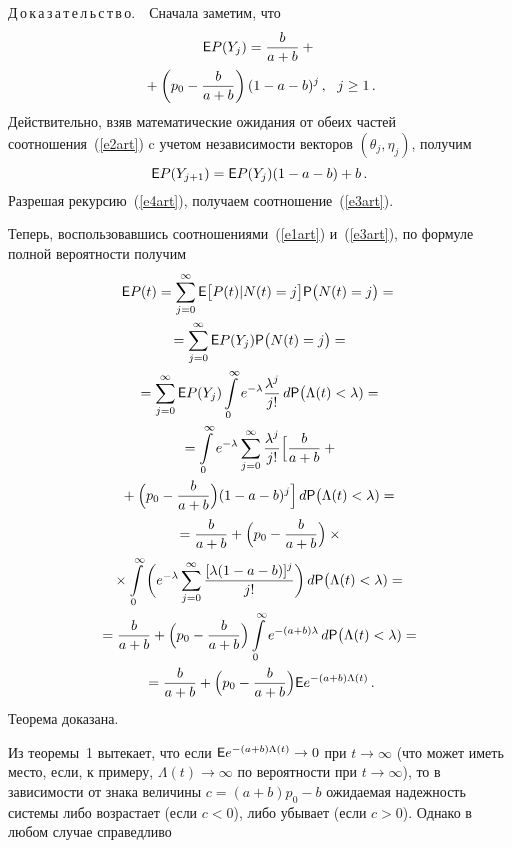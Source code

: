 \begin{multicols}{2}
\smallskip

\noindent
Д\,о\,к\,а\,з\,а\,т\,е\,л\,ь\,с\,т\,в\,о.\ $\,$ Сначала заметим, что
\begin{multline}
{\sf E}P(Y_j)=\displaystyle\frac{\displaystyle b\mathstrut}{\displaystyle a+b\mathstrut}+{}\\
{}+\left (p_0-\displaystyle\frac{\displaystyle b\mathstrut}{\displaystyle a+b\mathstrut}\right )
(1-a-b)^j\,,\ \ j\ge1\,.
\label{e3art}
\end{multline}
Действительно, взяв математические ожидания от обеих частей
соотношения~(\ref{e2art}) c учетом независимости векторов
$(\theta_j,\eta_j)$, получим
\begin{equation}
{\sf E}P(Y_{j+1})={\sf E}P(Y_j)(1-a-b)+b\,.
\label{e4art}
\end{equation}
Разрешая рекурсию~(\ref{e4art}), получаем соотношение~(\ref{e3art}).

Теперь, воспользовавшись соотношениями~(\ref{e1art}) и~(\ref{e3art}),
по формуле полной вероятности получим
\begin{multline*}
{\sf E}P(t)=\sum_{j=0}^{\infty}{\sf E}\big[P(t)|N(t)=j\big]{\sf
P}\big(N(t)=j\big)={}\\
{}=\sum_{j=0}^{\infty}{\sf E}P(Y_j){\sf
P}\big(N(t)=j\big)={}\\
{}=\sum_{j=0}^{\infty}{\sf
E}P(Y_j)\int\limits_{0}^{\infty}e^{-\lambda}\displaystyle\frac{\displaystyle \lambda^j\mathstrut}{\displaystyle j!\mathstrut}\,d{\sf
P}\big(\Lambda(t)<\lambda)=
{}\\
{}=
\int\limits_{0}^{\infty}e^{-\lambda}\sum_{j=0}^{\infty}\displaystyle\frac{\displaystyle \lambda^j\mathstrut}{\displaystyle j!\mathstrut}\Big[
\displaystyle\frac{\displaystyle b\mathstrut}{\displaystyle a+b\mathstrut}+{}\\
{}+ \Big(p_0-\displaystyle\frac{\displaystyle b\mathstrut}{\displaystyle a+b\mathstrut}\Big)
(1-a-b)^j\Big]\,d{\sf P}\big(\Lambda(t)<\lambda)=
{}\\
{}
=\displaystyle\frac{\displaystyle b\mathstrut}{\displaystyle a+b\mathstrut}+\Big(p_0-\displaystyle\frac{\displaystyle b\mathstrut}{\displaystyle a+b\mathstrut}\Big)\times{}\\
{}\times \int\limits_{0}^{\infty}\bigg(e^{-\lambda}
\sum_{j=0}^{\infty}\displaystyle\frac{\displaystyle [\lambda(1-a-b)]^j\mathstrut}{\displaystyle j!\mathstrut}\bigg)\,d{\sf
P}\big(\Lambda(t)<\lambda)=
{}\\
{}
=\displaystyle\frac{\displaystyle b\mathstrut}{\displaystyle a+b\mathstrut}+\Big(p_0-\displaystyle\frac{\displaystyle b\mathstrut}{\displaystyle a+b\mathstrut}\Big)\int\limits_{0}^{\infty}e^{-(a+b)\lambda}\,d{\sf
P}\big(\Lambda(t)<\lambda)={}\\
{}
=\displaystyle\frac{\displaystyle b\mathstrut}{\displaystyle a+b\mathstrut}+\Big(p_0-\displaystyle\frac{\displaystyle b\mathstrut}{\displaystyle a+b\mathstrut}\Big){\sf
E}e^{-(a+b)\Lambda(t)}\,.
\end{multline*}
Теорема доказана.

\smallskip

Из теоремы~1 вытекает, что если ${\sf E}e^{-(a+b)\Lambda(t)}\to 0$
при $t\to\infty$ (что может иметь место, если, к примеру,
$\Lambda(t)\to\infty$ по вероятности при $t\to\infty$), то в
зависимости от знака величины $c=(a+b)p_0-b$ ожидаемая надежность
системы либо возрастает (если $c<0$), либо убывает (если $c>0$).
Однако в любом случае справедливо


\end{multicols}
